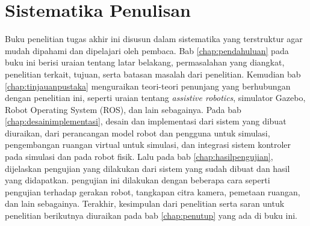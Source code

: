 \section{Sistematika Penulisan}
\label{sec:sistematikapenulisan}

Buku penelitian tugas akhir ini disusun dalam sistematika yang terstruktur agar mudah dipahami dan dipelajari oleh pembaca.
Bab \ref{chap:pendahuluan} pada buku ini berisi uraian tentang latar belakang, permasalahan yang diangkat, penelitian terkait, tujuan, serta batasan masalah dari penelitian.
Kemudian bab \ref{chap:tinjauanpustaka} menguraikan teori-teori penunjang yang berhubungan dengan penelitian ini,
  seperti uraian tentang \emph{assistive robotics}, simulator Gazebo, Robot Operating System (ROS),
  dan lain sebagainya.
Pada bab \ref{chap:desainimplementasi}, desain dan implementasi dari sistem yang dibuat diuraikan,
  dari perancangan model robot dan pengguna untuk simulasi, pengembangan ruangan virtual untuk simulasi,
  dan integrasi sistem kontroler pada simulasi dan pada robot fisik.
Lalu pada bab \ref{chap:hasilpengujian}, dijelaskan pengujian yang dilakukan dari sistem yang sudah dibuat dan hasil yang didapatkan.
pengujian ini dilakukan dengan beberapa cara seperti pengujian terhadap gerakan robot,
  tangkapan citra kamera, pemetaan ruangan, dan lain sebagainya.
Terakhir, kesimpulan dari penelitian serta saran untuk penelitian berikutnya diuraikan pada bab \ref{chap:penutup} yang ada di buku ini.
